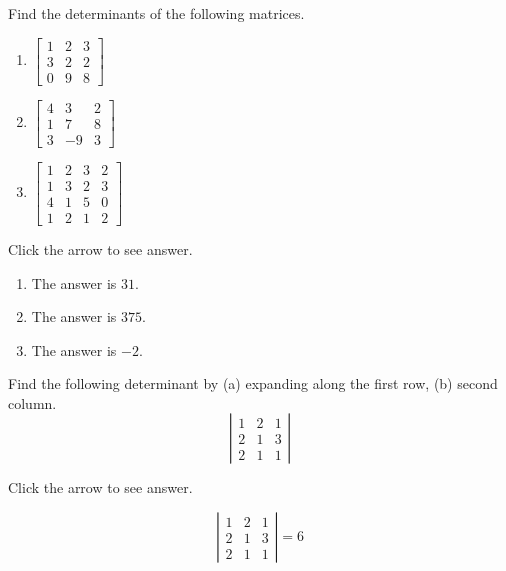 \documentclass{ximera}
\begin{document}
\begin{problem}\label{prb:7.3} Find the determinants of the following matrices.
\begin{enumerate}
\item $\left[
\begin{array}{rrr}
1 & 2 & 3 \\
3 & 2 & 2 \\
0 & 9 & 8
\end{array}
\right] $
\item $\left[
\begin{array}{rrr}
4 & 3 & 2 \\
1 & 7 & 8 \\
3 & -9 & 3
\end{array}
\right] $
\item $\left[
\begin{array}{rrrr}
1 & 2 & 3 & 2 \\
1 & 3 & 2 & 3 \\
4 & 1 & 5 & 0 \\
1 & 2 & 1 & 2
\end{array}
\right] $
\end{enumerate}

Click the arrow to see answer.
\begin{expandable}
\begin{enumerate}
\item The answer is $31$.
\item The answer is $375$.
\item The answer is $-2$.
\end{enumerate}
\end{expandable}
\end{problem}

\begin{problem}\label{prb:7.4} Find the following determinant by (a) expanding along the first row, (b)
second column.
\begin{equation*}
\left|
\begin{array}{rrr}
1 & 2 & 1 \\
2 & 1 & 3 \\
2 & 1 & 1
\end{array}
\right|
\end{equation*}

Click the arrow to see answer.
\begin{expandable}
\[
\left|
\begin{array}{ccc}
1 & 2 & 1 \\
2 & 1 & 3 \\
2 & 1 & 1
\end{array}
\right| =  6
\]
\end{expandable}
\end{problem}
\end{document}
